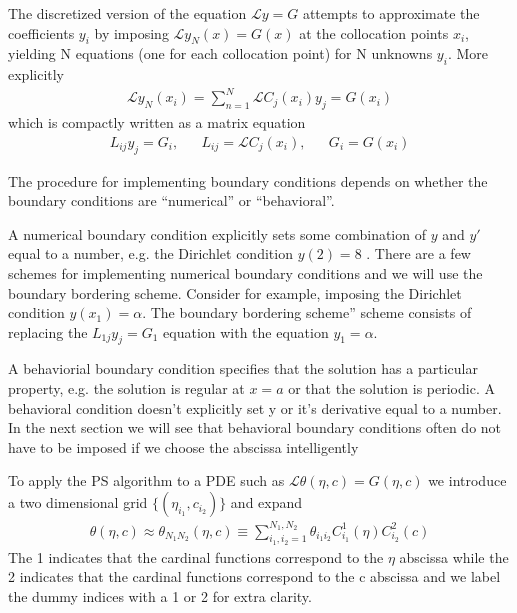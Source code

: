 \documentclass[aps,prd,amsmath,showpacs,amssymb,superscriptaddress,nofootinbib,longbibliography,eqsecnum,preprintnumbers]{revtex4-1}
\begin{document}
The discretized version of the equation $\mathcal{L} y =G$ attempts to approximate the coefficients $y_i$ by imposing $\mathcal{L} y_N(x) =G(x)$ at the collocation points $x_i$, yielding N equations (one for each collocation point) for N unknowns $y_i$. More explicitly
\begin{align}
\mathcal{L} y_N(x_i) =\sum_{n=1}^N \mathcal{L}C_j(x_i)y_j =G(x_i)
\end{align}
which is compactly written as a matrix equation
\begin{align}
&L_{ij}y_j=G_i,& &L_{ij}=\mathcal{L}C_j(x_i),&
&G_i=G(x_i)&
\end{align}

The procedure for implementing boundary conditions depends on whether the boundary conditions are ``numerical'' or ``behavioral''\cite{Boyd99chebyshevand}. 

A numerical boundary condition explicitly sets some combination of $y$ and $y'$ equal to a number, e.g. the Dirichlet condition $y(2)=8$ . There are a few schemes for implementing numerical boundary conditions and we will use the boundary bordering scheme. Consider for example, imposing the Dirichlet condition $y(x_1) =\alpha$. The boundary bordering scheme''  scheme consists of replacing the $L_{1j}y_j=G_1$ equation with the equation $y_1=\alpha$. 

A behaviorial boundary condition specifies that the solution has a particular property, e.g. the solution is regular at $x=a$ or that the solution is periodic. A behavioral condition  doesn't explicitly set y or it's derivative equal to a number. In the next section we will see that behavioral boundary conditions often do not have to be imposed if we choose the abscissa intelligently


To apply the PS algorithm to a PDE such as $\mathcal L \theta(\eta,c)=G(\eta,c)$ we introduce a two dimensional grid $\{(\eta_{i_1}, c_{i_2})\}$ and expand
\begin{align}
\theta(\eta, c) \approx \theta_{N_1N_2}(\eta,c) \equiv \sum_{i_1, i_2 =1}^{N_1,N_2} \theta_{i_1i_2}C^1_{i_1}(\eta)C^2_{i_2}(c)
\end{align}
The 1 indicates that the cardinal functions correspond to the $\eta$ abscissa while the 2 indicates that the cardinal functions correspond to the c abscissa and we label the dummy indices with a 1 or 2 for extra clarity.
\end{document}
